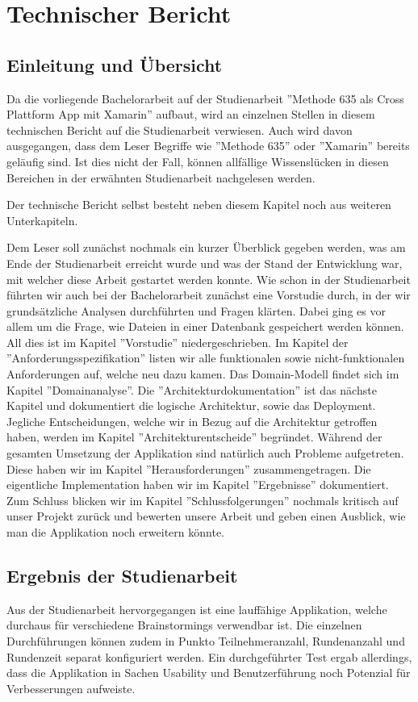 \section{Technischer Bericht}

\subsection{Einleitung und Übersicht}
Da die vorliegende Bachelorarbeit auf der Studienarbeit ''Methode 635 als Cross Plattform App mit Xamarin'' \cite{methode635-sa} aufbaut, wird an einzelnen Stellen in diesem technischen Bericht auf die Studienarbeit verwiesen. Auch wird davon ausgegangen, dass dem Leser Begriffe wie ''Methode 635'' oder ''Xamarin'' bereits geläufig sind. Ist dies nicht der Fall, können allfällige Wissenslücken in diesen Bereichen in der erwähnten Studienarbeit nachgelesen werden.

Der technische Bericht selbst besteht neben diesem Kapitel noch aus weiteren Unterkapiteln. 

Dem Leser soll zunächst nochmals ein kurzer Überblick gegeben werden, was am Ende der Studienarbeit erreicht wurde und was der Stand der Entwicklung war, mit welcher diese Arbeit gestartet werden konnte. Wie schon in der Studienarbeit führten wir auch bei der Bachelorarbeit zunächst eine Vorstudie durch, in der wir grundsätzliche Analysen durchführten und Fragen klärten. Dabei ging es vor allem um die Frage, wie Dateien in einer Datenbank gespeichert werden können. All dies ist im Kapitel ''Vorstudie'' niedergeschrieben. Im Kapitel der ''Anforderungsspezifikation'' listen wir alle funktionalen sowie nicht-funktionalen Anforderungen auf, welche neu dazu kamen. Das Domain-Modell findet sich im Kapitel ''Domainanalyse''. Die ''Architektur\-dokumentation'' ist das nächste Kapitel und dokumentiert die logische Architektur, sowie das Deployment. Jegliche Entscheidungen, welche wir in Bezug auf die Architektur getroffen haben, werden im Kapitel ''Architekturentscheide'' begründet. Während der gesamten Umsetzung der Applikation sind natürlich auch Probleme aufgetreten. Diese haben wir im Kapitel ''Herausforderungen'' zusammengetragen. Die eigentliche Implementation haben wir im Kapitel ''Ergebnisse'' dokumentiert. Zum Schluss blicken wir im Kapitel ''Schlussfolgerungen'' nochmals kritisch auf unser Projekt zurück und bewerten unsere Arbeit und geben einen Ausblick, wie man die Applikation noch erweitern könnte.

\subsection{Ergebnis der Studienarbeit}
Aus der Studienarbeit hervorgegangen ist eine lauffähige Applikation, welche durchaus für verschiedene Brainstormings verwendbar ist. Die einzelnen Durchführungen können zudem in Punkto Teilnehmeranzahl, Rundenanzahl und Rundenzeit separat konfiguriert werden. Ein durchgeführter Test ergab allerdings, dass die Applikation in Sachen Usability und Benutzerführung noch Potenzial für Verbesserungen aufweiste.


